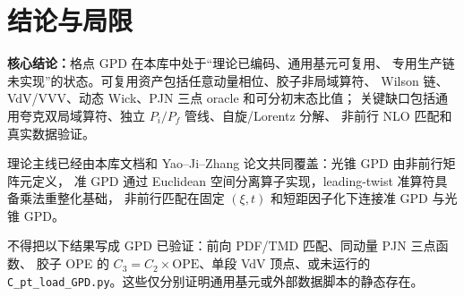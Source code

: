 \documentclass[UTF8]{ctexart}
\begin{document}
\section{结论与局限}

\begin{conclbox}
\textbf{核心结论：}格点 GPD 在本库中处于“理论已编码、通用基元可复用、
专用生产链未实现”的状态。可复用资产包括任意动量相位、胶子非局域算符、
Wilson 链、VdV/VVV、动态 Wick、PJN 三点 oracle 和可分初末态比值；
关键缺口包括通用夸克双局域算符、独立 $P_i/P_f$ 管线、自旋/Lorentz 分解、
非前行 NLO 匹配和真实数据验证。
\end{conclbox}

\begin{refbox}
理论主线已经由本库文档和 Yao--Ji--Zhang 论文共同覆盖：光锥 GPD 由非前行矩阵元定义，
准 GPD 通过 Euclidean 空间分离算子实现，leading-twist 准算符具备乘法重整化基础，
非前行匹配在固定 $(\xi,t)$ 和短距因子化下连接准 GPD 与光锥 GPD。
\end{refbox}

\begin{warnbox}
不得把以下结果写成 GPD 已验证：前向 PDF/TMD 匹配、同动量 PJN 三点函数、
胶子 OPE 的 $C_3=C_2\times\mathrm{OPE}$、单段 VdV 顶点、或未运行的
\texttt{C\_pt\_load\_GPD.py}。这些仅分别证明通用基元或外部数据脚本的静态存在。
\end{warnbox}
\end{document}
